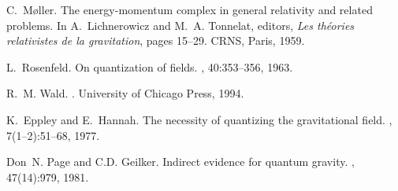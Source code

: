 \documentclass[11pt]{amsart}
\theoremstyle{definition}
\theoremstyle{plain}
\begin{document}
\begin{thebibliography}{10}
C.~M{\o}ller.
\newblock The energy-momentum complex in general relativity and related
  problems.
\newblock In A.~Lichnerowicz and M.~A. Tonnelat, editors, {\em Les th\'eories
  relativistes de la gravitation}, pages 15--29. CRNS, Paris, 1959.

L.~Rosenfeld.
\newblock On quantization of fields.
, 40:353--356, 1963.

R.~M. Wald.
.
\newblock University of Chicago Press, 1994.

K.~Eppley and E.~Hannah.
\newblock The necessity of quantizing the gravitational field.
, 7(1--2):51--68, 1977.

Don~N. Page and C.D. Geilker.
\newblock Indirect evidence for quantum gravity.
, 47(14):979, 1981.

\end{thebibliography}
\end{document}
